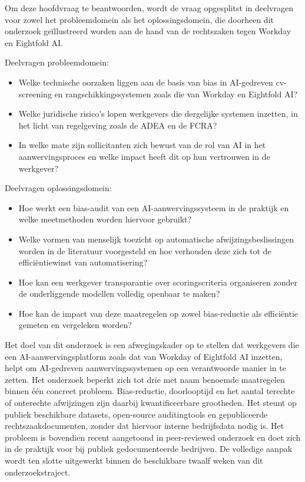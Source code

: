 \documentclass{hogent-article}
\begin{document}
Om deze hoofdvraag te
beantwoorden, wordt de vraag opgesplitst in deelvragen voor zowel het
probleemdomein als het oplossingsdomein, die doorheen dit onderzoek
geïllustreerd worden aan de hand van de rechtszaken tegen Workday en
Eightfold AI.

Deelvragen probleemdomein:
\begin{itemize}
  \item Welke technische oorzaken liggen aan de basis van bias in
    AI-gedreven cv-screening en rangschikkingssystemen zoals die van
    Workday en Eightfold AI?
  \item Welke juridische risico's lopen werkgevers die dergelijke systemen
    inzetten, in het licht van regelgeving zoals de ADEA en de FCRA?
  \item In welke mate zijn sollicitanten zich bewust van de rol van AI in
    het aanwervingsproces en welke impact heeft dit op hun vertrouwen in de
    werkgever?
\end{itemize}

Deelvragen oplossingsdomein:
\begin{itemize}
  \item Hoe werkt een bias-audit van een AI-aanwervingssysteem in de
    praktijk en welke meetmethoden worden hiervoor gebruikt?
  \item Welke vormen van menselijk toezicht op automatische
    afwijzingsbeslissingen worden in de literatuur voorgesteld en hoe
    verhouden deze zich tot de efficiëntiewinst van automatisering?
  \item Hoe kan een werkgever transparantie over scoringscriteria
    organiseren zonder de onderliggende modellen volledig openbaar te
    maken?
  \item Hoe kan de impact van deze maatregelen op zowel bias-reductie als
    efficiëntie gemeten en vergeleken worden?
\end{itemize}

Het doel van dit onderzoek is een afwegingskader op te stellen dat
werkgevers die een AI-aanwervingsplatform zoals dat van Workday of
Eightfold AI inzetten, helpt om AI-gedreven aanwervingssystemen op een
verantwoorde manier in te zetten. Het onderzoek beperkt zich tot drie met
naam benoemde maatregelen binnen één concreet probleem. Bias-reductie,
doorlooptijd en het aantal terechte of onterechte afwijzingen zijn daarbij
kwantificeerbare grootheden. Het steunt op publiek beschikbare datasets,
open-source auditingtools en gepubliceerde rechtszaakdocumenten, zonder dat
hiervoor interne bedrijfsdata nodig is. Het probleem is bovendien recent
aangetoond in peer-reviewed onderzoek en doet zich in de praktijk voor bij
publiek gedocumenteerde bedrijven. De volledige aanpak wordt ten slotte
uitgewerkt binnen de beschikbare twaalf weken van dit onderzoekstraject.
\end{document}
